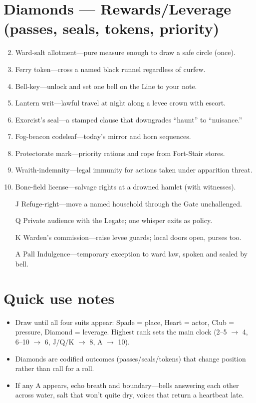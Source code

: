 \section*{Diamonds --- Rewards/Leverage (passes, seals, tokens, priority)}
\begin{enumerate}
\setcounter{enumi}{1}
\item Ward-salt allotment---pure measure enough to draw a safe circle (once).
\item Ferry token---cross a named black runnel regardless of curfew.
\item Bell-key---unlock and set one bell on the Line to your note.
\item Lantern writ---lawful travel at night along a levee crown with escort.
\item Exorcist's seal---a stamped clause that downgrades ``haunt'' to ``nuisance.''
\item Fog-beacon codeleaf---today's mirror and horn sequences.
\item Protectorate mark---priority rations and rope from Fort-Stair stores.
\item Wraith-indemnity---legal immunity for actions taken under apparition threat.
\item Bone-field license---salvage rights at a drowned hamlet (with witnesses).
\item[J] Refuge-right---move a named household through the Gate unchallenged.
\item[Q] Private audience with the Legate; one whisper exits as policy.
\item[K] Warden's commission---raise levee guards; local doors open, purses too.
\item[A] Pall Indulgence---temporary exception to ward law, spoken and sealed by bell.
\end{enumerate}

\section*{Quick use notes}
\begin{itemize}
\item Draw until all four suits appear: Spade = place, Heart = actor, Club = pressure, Diamond = leverage. Highest rank sets the main clock (2--5 $\rightarrow$ 4, 6--10 $\rightarrow$ 6, J/Q/K $\rightarrow$ 8, A $\rightarrow$ 10).
\item Diamonds are codified outcomes (passes/seals/tokens) that change position rather than call for a roll.
\item If any A appears, echo breath and boundary---bells answering each other across water, salt that won't quite dry, voices that return a heartbeat late.
\end{itemize}
